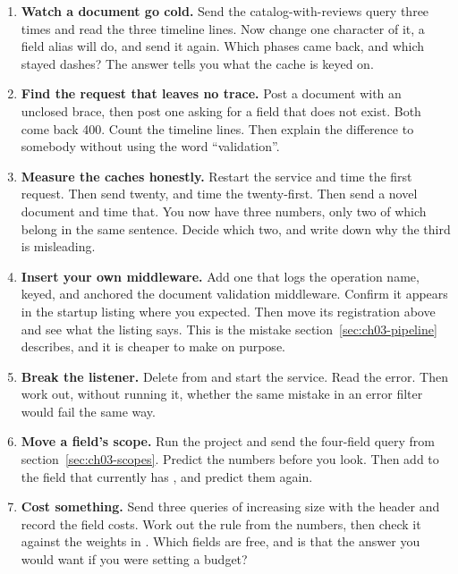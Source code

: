 \begin{enumerate}
  \item \textbf{Watch a document go cold.} Send the catalog-with-reviews query
  three times and read the three timeline lines. Now change one character of it,
  a field alias will do, and send it again. Which phases came back, and which
  stayed dashes? The answer tells you what the cache is keyed on.

  \item \textbf{Find the request that leaves no trace.} Post a document with an
  unclosed brace, then post one asking for a field that does not exist. Both
  come back 400. Count the timeline lines. Then explain the difference to
  somebody without using the word \enquote{validation}.

  \item \textbf{Measure the caches honestly.} Restart the service and time the
  first request. Then send twenty, and time the twenty-first. Then send a novel
  document and time that. You now have three numbers, only two of which belong
  in the same sentence. Decide which two, and write down why the third is
  misleading.

  \item \textbf{Insert your own middleware.} Add one that logs the operation
  name, keyed, and anchored  the document validation middleware.
  Confirm it appears in the startup listing where you expected. Then move its
  registration above  and see what the listing says. This is
  the mistake section~\ref{sec:ch03-pipeline} describes, and it is cheaper to
  make on purpose.

  \item \textbf{Break the listener.} Delete
   from  and
  start the service. Read the error. Then work out, without running it, whether
  the same mistake in an error filter would fail the same way.

  \item \textbf{Move a field's scope.} Run the 
  project and send the four-field query from
  section~\ref{sec:ch03-scopes}. Predict the numbers before you look. Then add
  \code{[UseResolverScope]} to the field that currently has
  \code{[UseRequestScope]}, and predict them again.

  \item \textbf{Cost something.} Send three queries of increasing size with the
   header and record the field costs. Work out the
  rule from the numbers, then check it against the  weights in
  . Which fields are free, and is that the answer
  you would want if you were setting a budget?
\end{enumerate}

